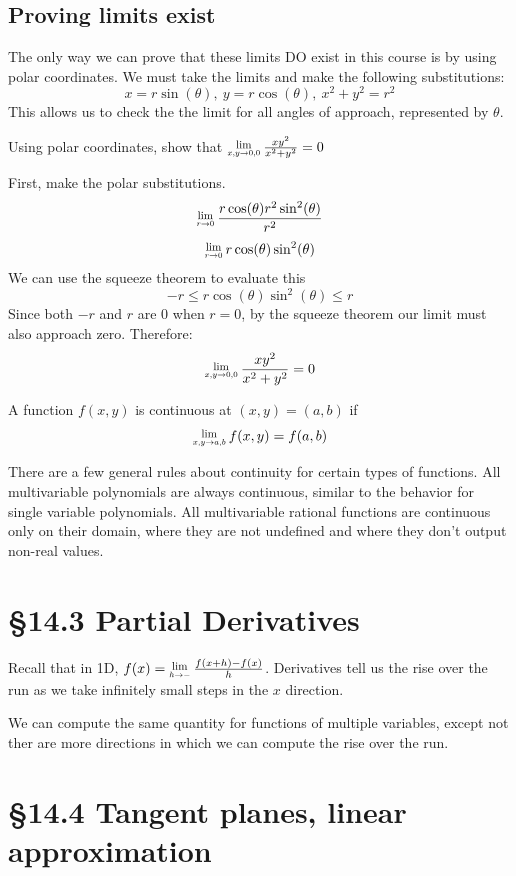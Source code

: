 \documentclass[12 pt]{article}
\begin{document}
        \subsection{Proving limits exist}

        The only way we can prove that these limits DO exist in this course is by using polar coordinates. We must take the limits and make the following substitutions:
        $$x=r\sin(\theta),\ y=r\cos(\theta),\ x^2+y^2=r^2$$
        This allows us to check the the limit for all angles of approach, represented by $\theta$.
        \begin{exmp*}
            Using polar coordinates, show that $\Lim{x,y\rightarrow 0,0} \frac{xy^2}{x^2+y^2}=0$

            First, make the polar substitutions.
            $$\Lim{r\rightarrow 0}\frac{r\cos(\theta)r^2\sin^2(\theta)}{r^2}$$
            $$\Lim{r\rightarrow 0}r\cos(\theta)\sin^2(\theta)$$
            We can use the squeeze theorem to evaluate this
            $$-r\leq r\cos(\theta)\sin^2(\theta)\leq r$$
            Since both $-r$ and $r$ are 0 when $r=0$, by the squeeze theorem our limit must also approach zero. Therefore:
            $$\Lim{x,y\rightarrow 0,0}\frac{xy^2}{x^2+y^2}=0$$
        \end{exmp*}
        \begin{def*}A function $f(x,y)$ is continuous at $(x,y)=(a,b)$ if
            $$\Lim{x,y\rightarrow a,b}f(x,y)=f(a,b)$$
        \end{def*}
        There are a few general rules about continuity for certain types of functions. All multivariable polynomials are always continuous, similar to the behavior for single variable polynomials. All multivariable rational functions are continuous only on their domain, where they are not undefined and where they don't output non-real values.
    \section{\S 14.3 Partial Derivatives}
        Recall that in 1D, $f(x)=\Lim{h\rightarrow -}\frac{f(x+h)-f(x)}{h}$.
        Derivatives tell us the rise over the run as we take infinitely small steps in the $x$ direction.

        We can compute the same quantity for functions of multiple variables, except not ther are more directions in which we can compute the rise over the run.
    \section{\S 14.4 Tangent planes, linear approximation}
\end{document}
